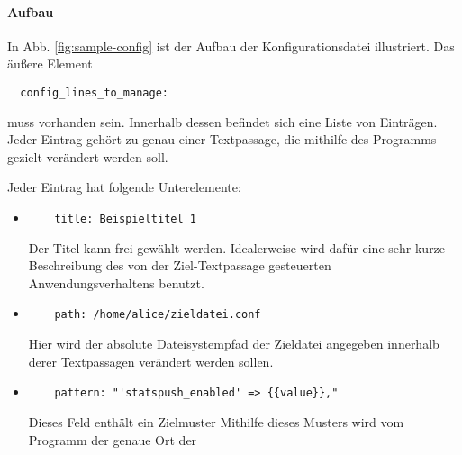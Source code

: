 \paragraph{Aufbau}
In Abb. \ref{fig:sample-config} ist der Aufbau der Konfigurationsdatei
illustriert. Das äußere Element

\begin{verbatim}
  config_lines_to_manage:
\end{verbatim}

muss vorhanden sein. Innerhalb dessen befindet sich eine Liste von Einträgen.
Jeder Eintrag gehört zu genau einer \gls{Textpassage}, die mithilfe des
Programms gezielt verändert werden soll.

Jeder Eintrag hat folgende Unterelemente:

\begin{itemize}
  \item \begin{verbatim}
    title: Beispieltitel 1
  \end{verbatim}
        Der Titel kann frei gewählt werden. Idealerweise wird dafür eine sehr
        kurze Beschreibung des von der Ziel-\gls{Textpassage} gesteuerten
        Anwendungsverhaltens benutzt.
  \item \begin{verbatim}
    path: /home/alice/zieldatei.conf
  \end{verbatim}
        Hier wird der absolute Dateisystempfad der Zieldatei angegeben innerhalb
        derer \gls{Textpassage}n  verändert werden sollen.
  \item \begin{verbatim}
    pattern: "'statspush_enabled' => {{value}},"
  \end{verbatim}
        Dieses Feld enthält ein \gls{Zielmuster}
        Mithilfe dieses Musters wird vom Programm der genaue Ort der
\end{itemize}